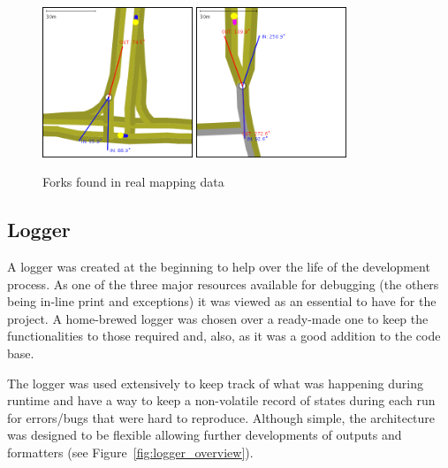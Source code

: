 \begin{figure}[h]
    \caption{Forks found in real mapping data}
    \label{fig:forkTypes}
    \centering
    \includegraphics[width=0.4\textwidth]{figs/junction/junction_oneway_to_fork.png}
    \hspace{0.2em}
    \includegraphics[width=0.4\textwidth]{figs/junction/junction_two_way_to_fork.png}
\end{figure}



\subsection{Logger}

A logger was created at the beginning to help over the life of the development process. As one of the three major resources available for debugging (the others being in-line print and exceptions) it was viewed as an essential to have for the project. A home-brewed logger was chosen over a ready-made one to keep the functionalities to those required and, also, as it was a good addition to the code base.

The logger was used extensively to keep track of what was happening during runtime and have a way to keep a non-volatile record of states during each run for errors/bugs that were hard to reproduce. Although simple, the architecture was designed to be flexible allowing further developments of outputs and formatters (see Figure~\ref{fig:logger_overview}).

